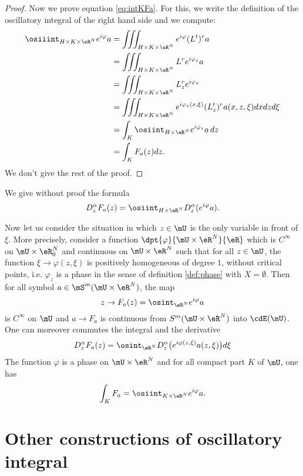 \begin{proof}
Now we prove equation \eqref{eq:intKFa}. For this, we write the definition of the oscillatory integral of the right hand side and we compute:
\begin{equation}
\begin{split}
  \osiiint_{H\times K\times\eR^N}e^{i\varphi}a	&=\iiint_{H\times K\times\eR^N}e^{i\varphi}(L^t)^ra \\
						&=\iiint_{H\times K\times\eR^N}L^re^{i\varphi_z}a\\
						&=\iiint_{H\times K\times\eR^N}L_z^re^{i\varphi_z}\\
						&=\iiint_{H\times K\times\eR^N}e^{i\varphi_z(x,\xi)}(L_z^t)^ra(x,z,\xi)dxdzd\xi\\
						&=\int_K\osiint_{H\times\eR^N}e^{i\varphi_z}a\,dz\\
						&=\int_KF_a(z)dz.
\end{split}
\end{equation}
We don't give the rest of the proof.

\end{proof}

We give without proof the formula
\begin{equation}
D_z^{\alpha}F_a(z)=\osiint_{H\times\eR^N}D_z^{\alpha}(e^{i\varphi}a).
\end{equation}

Now let us consider the situation in which $z\in\mU$ is the only variable in front of $\xi$. More precisely, consider a function $\dpt{\varphi}{\mU\times\eR^N}{\eR}$ which is $C^{\infty}$ on $\mU\times\eR^N_0$ and continuous on $\mU\times\eR^N$ such that for all $z\in\mU$, the function $\xi\to\varphi(z,\xi)$ is positively homogeneous of degree $1$, without critical points, i.e. $\varphi_z$ is a phase in the sense of definition \ref{def:phase} with $X=\emptyset$. Then for all symbol $a\in\mS^m(\mU\times\eR^N)$, the map
\[ 
  z\to F_a(z)=\osint_{\eR^N}e^{i\varphi}a
\]
is $C^{\infty}$ on $\mU$ and  $a\to F_a$ is continuous from $S^m(\mU\times\eR^N)$ into $\cdE(\mU)$. One can moreover commutes the integral and the derivative
\[ 
  D_z^{\alpha}F_a(z)=\osint_{\eR^N}D^{\alpha}_z\big( e^{i\varphi(z,\xi)}a(z,\xi) \big)d\xi
\]
The function $\varphi$ is a phase on $\mU\times\eR^N$ and for all compact part $K$ of $\mU$, one has
\[ 
  \int_KF_a=\osiint_{K\times\eR^N}e^{i\varphi}a.
\]
	
\section{Other constructions of oscillatory integral}

